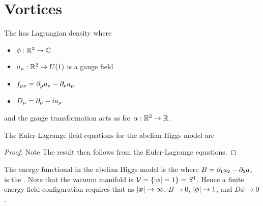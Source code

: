 \documentclass{article}
\begin{document}
\section{Vortices}

\begin{definition}
The  has Lagrangian density 
where 
\begin{itemize}
    \item $\phi:\mathbb{R}^2 \to \mathbb{C}$
    \item $a_\mu : \mathbb{R}^2 \to U(1)$ is a gauge field
    \item $f_{\mu\nu} = \partial_\mu a_\nu - \partial_\nu a_\mu$
    \item $D_\mu = \partial_\mu - ia_\mu$
\end{itemize}
and the gauge transformation acts as
for $\alpha : \mathbb{R}^2 \to \mathbb{R}$. 
\end{definition}

\begin{prop}
The Euler-Lagrange field equations for the abelian Higgs model are 
\end{prop}
\begin{proof}
Note 
The result then follows from the Euler-Lagrange equations. 
\end{proof}

\begin{prop}
The energy functional in the abelian Higgs model is the 
where $B = \partial_1 a_2 - \partial_2 a_1$ is the . Note that the vacuum manifold is $\mathcal{V} = \left\{ \left\lvert \phi \right\rvert = 1 \right\} = S^1$. Hence a finite energy field configuration requires that as $\left\lvert \bm{x} \right\rvert\to\infty$, $B\to 0$, $\left\lvert \phi \right\rvert\to 1$, and $D\phi \to 0$. 
\end{prop}
\end{document}
